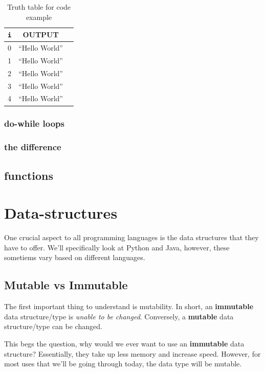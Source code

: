 \documentclass[12pt,a4paper]{book}
\begin{document}
					\begin{table}[H]
						\centering
						\begin{tabular}{c|c|c}
							\texttt{i} & OUTPUT \\
							\hline
							0 &  ``Hello World'' \\
							1 &  ``Hello World'' \\
							2 &  ``Hello World'' \\
							3 &  ``Hello World'' \\
							4 &  ``Hello World'' \\
						\end{tabular}
						\caption{Truth table for code example}
						\label{tab:for-def-tt}
					\end{table}

				\subsection{do-while loops}


				\subsection{the difference}


		\section{functions}
		
	\chapter{Data-structures}  \label{chap:datastructures}
		One crucial aspect to all programming languages is the data structures that they have to offer. We'll specifically look at Python and Java, however, these sometiems vary based on different  languages.
		\section{Mutable vs Immutable}
			The first important thing to understand is mutability. In short, an \textbf{immutable} data structure/type is \textit{unable to be changed}. Conversely, a \textbf{mutable} data structure/type can be changed.
			
			This begs the question, why would we ever want to use an \textbf{immutable} data structure? Essentially, they take up less memory and increase speed. However, for most uses that we'll be going through today, the data type will be mutable.
\end{document}

